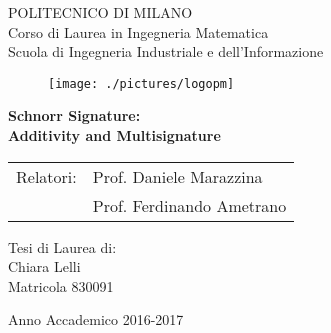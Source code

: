 \thispagestyle{empty}
\vspace*{-1.5cm} \bfseries{
\begin{center}
  \large
  POLITECNICO DI MILANO\\
  \medskip
  \normalsize
 Corso di Laurea in Ingegneria Matematica\\
  Scuola di Ingegneria Industriale e dell’Informazione\\
  \medskip
  
  \begin{figure}[htbp]
    \begin{center}
      \texttt{[image: ./pictures/logopm]}
    \end{center}
  \end{figure}
  \vspace*{0.3cm} \huge



  \textbf{Schnorr Signature: \\ Additivity and Multisignature}\\



\end{center}
\vspace*{8.0cm} \large
\begin{flushleft}

\begin{tabular}{ll}
	Relatori:& Prof. Daniele Marazzina\\
	& Prof. Ferdinando Ametrano\\
\end{tabular}


\end{flushleft}
\vspace*{1.5cm}
\begin{flushright}


  Tesi di Laurea di:\\ Chiara Lelli \\Matricola 830091


\end{flushright}
\vspace*{0.5cm}
\begin{center}



  Anno Accademico 2016-2017
\end{center} \clearpage
}
